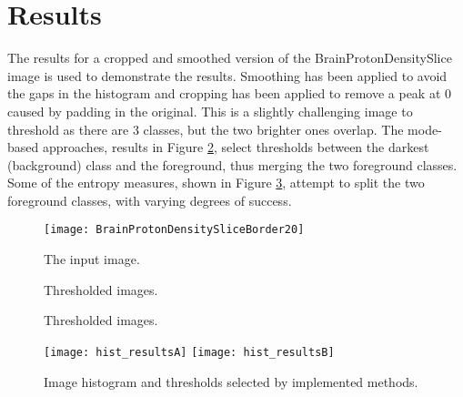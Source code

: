 \documentclass{InsightArticle}
\begin{document}
\section{Results}
The results for a cropped and smoothed version of the BrainProtonDensitySlice image is used to demonstrate the results. Smoothing has been applied to avoid the gaps in the histogram and cropping has been applied to remove a peak at 0 caused by padding in the original. This is a slightly challenging image to threshold as there are 3 classes, but the two brighter ones overlap. The mode-based approaches, results in Figure \ref{fig:bpdthreshA}, select thresholds between the darkest (background) class and the foreground, thus merging the two foreground classes. Some of the entropy measures, shown in Figure \ref{fig:bpdthreshB}, attempt to split the two foreground classes, with varying degrees of success.

\begin{figure}[htbp]
\centering
\texttt{[image: BrainProtonDensitySliceBorder20]}
\caption{The input image.\label{fig:bpd}}
\end{figure}

\begin{figure}[htbp]
\centering
{}

\caption{Thresholded images.\label{fig:bpdthreshA}}
\end{figure}

\begin{figure}[htbp]
\centering
{}

\caption{Thresholded images.\label{fig:bpdthreshB}}
\end{figure}

\begin{figure}[htbp]
\centering
\texttt{[image: hist\_resultsA]}
\texttt{[image: hist\_resultsB]}
\caption{Image histogram and thresholds selected by implemented methods.\label{fig:thresh}}
\end{figure}
\end{document}
